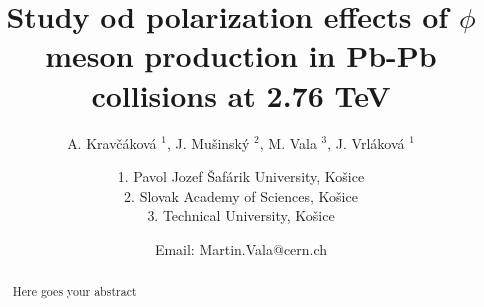\documentclass[ALICE,manyauthors]{ALICE_analysis_notes}
\def\ll{l\kern-0.6mm\char 39\kern-0.3mm}
\begin{document}
%
%
%
\begin{titlepage}
%
\PHdate{\today}
%
\title{Study od polarization effects of $\phi$ meson production in Pb-Pb collisions at 2.76 TeV}
%
\author{A. Krav\v c\'akov\'a $^{1}$, J. Mu\v sinsk\'y $^{2}$, M. Va\ll a $^{3}$, J. Vrl\'akov\'a $^{1}$}
\author{
1. Pavol Jozef  \v Saf\'arik University, Ko\v sice\\
2. Slovak Academy of Sciences, Ko\v sice \\
3. Technical University,   Ko\v sice\\
}
\author{Email: Martin.Vala@cern.ch}
%
%
\begin{abstract}
Here goes your abstract
\end{abstract}
\end{titlepage}
%
\end{document}
